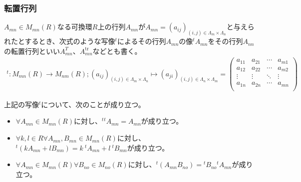 \documentclass[dvipdfmx]{jsarticle}
\begin{document}
\subsubsection{転置行列}%
\begin{dfn}
$A_{mn} \in M_{mn}(R)$なる可換環$R$上の行列$A_{mn}$が$A_{mn} = \left( a_{ij} \right)_{(i,j) \in \varLambda_{m} \times \varLambda_{n}}$と与えられたとするとき、次式のような写像${}^{t}$によるその行列$A_{mn}$の像${}^{t}A_{mn}$をその行列$A_{nn}$の転置行列といい$A_{mn}^{T}$、$A_{mn}^{\mathrm{tr} }$などとも書く。
\begin{align*}
{}^{t}:M_{mn}(R) \rightarrow M_{nm}(R);\left( a_{ij} \right)_{(i,j) \in \varLambda_{m} \times \varLambda_{n}} \mapsto \left( a_{ji} \right)_{(i,j) \in \varLambda_{n} \times \varLambda_{m}} = \begin{pmatrix}
a_{11} & a_{21} & \cdots & a_{m1} \\
a_{12} & a_{22} & \cdots & a_{m2} \\
 \vdots & \vdots & \ddots & \vdots \\
a_{1n} & a_{2n} & \cdots & a_{mn} \\
\end{pmatrix}
\end{align*}
\end{dfn}
\begin{thm}\label{2.1.3.8}
上記の写像${}^{t}$について、次のことが成り立つ。
\begin{itemize}
\item
  $\forall A_{mn} \in M_{mn}(R)$に対し、${}^{t}{}^{t}A_{mn} = A_{mn}$が成り立つ。
\item
  $\forall k,l \in R\forall A_{mn},B_{mn} \in M_{mn}(R)$に対し、${}^{t}\left( kA_{mn} + lB_{mn} \right) = k\ {}^{t}A_{mn} + l\ {}^{t}B_{mn}$が成り立つ。
\item
  $\forall A_{mn} \in M_{mn}(R)\forall B_{no} \in M_{no}(R)$に対し、${}^{t}\left( A_{mn}B_{no} \right) ={}^{t}B_{no}{}^{t}A_{mn}$が成り立つ。
\end{itemize}
\end{thm}
\end{document}

